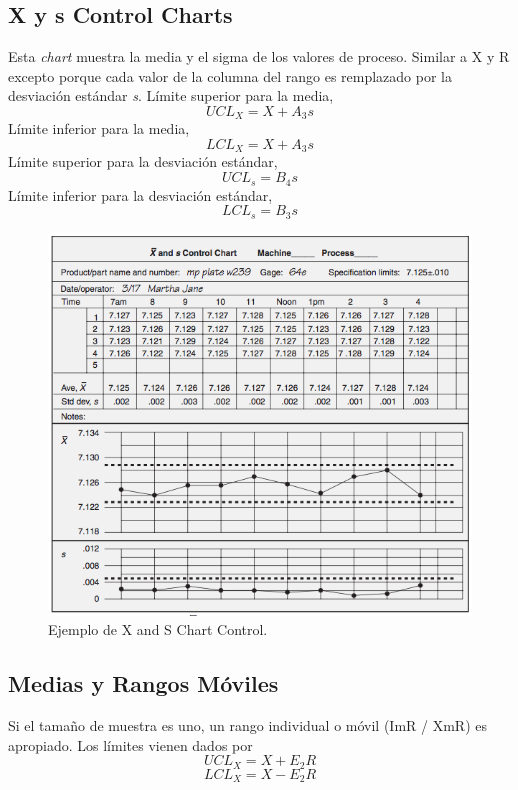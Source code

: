 \documentclass[oneside]{book}
\begin{document}
\subsection{X y s Control Charts}

Esta \textit{chart} muestra la media y el sigma de los valores de proceso. Similar a X y R excepto porque cada valor de la columna del rango es remplazado por la desviación estándar \textit{s}.
 Límite superior para la media,
 \begin{equation}
 UCL_X = X + A_3s
 \end{equation}
 Límite inferior para la media,
 \begin{equation}
 LCL_X = X + A_3s
 \end{equation}
 Límite superior para la desviación estándar,
 \begin{equation}
 UCL_s = B_4s
 \end{equation}
 Límite inferior  para la desviación estándar,
 \begin{equation}
 LCL_s = B_3s
 \end{equation}

\begin{figure}[H]
	\centering
	\includegraphics[width=120mm]{imagenes/XandsControlEjemplo.png}
	\caption{Ejemplo de X and S Chart Control.}
	\label{fig:XandSControlEjemplo}
\end{figure}

\subsection{Medias y Rangos Móviles}
Si el tamaño de muestra es uno, un rango individual o móvil (ImR / XmR) es apropiado. Los límites vienen dados por
\begin{equation}
UCL_X = X + E_2R
\end{equation}
\begin{equation}
LCL_X = X - E_2R
\end{equation}
\end{document}
